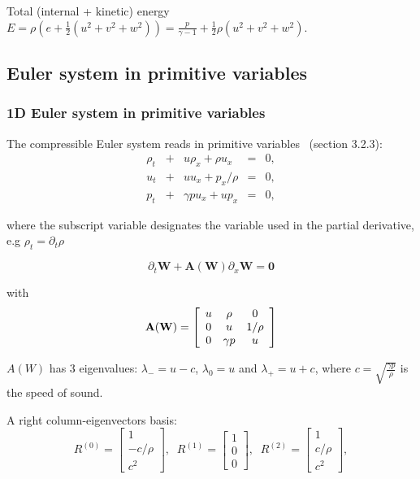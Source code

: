 \documentclass{article}
\begin{document}
Total (internal + kinetic) energy $E = \rho \left( e + \frac{1}{2} (u^2+v^2+w^2) \right) = \frac{p}{\gamma-1} + \frac{1}{2} \rho (u^2+v^2+w^2)$.

\subsection{Euler system in primitive variables}

\subsubsection*{1D Euler system in primitive variables}
The compressible Euler system reads in primitive variables~\cite{toro} (section 3.2.3):\\

\begin{equation}
  \begin{array}{ccccc}
    \rho_t & + & u\rho_x + \rho u_x   & = & 0,\\
    u_t    & + & u u_x   + p_x/\rho   & = & 0,\\
    p_t    & + & \gamma p u_x + u p_x & = & 0,
  \end{array}
\end{equation}

where the subscript variable designates the variable used in the partial derivative, e.g $\rho_t = \partial_t \rho$

\begin{equation}
  \partial_t \mathbf{W} + \mathbf{A(W)} \partial_x \mathbf{W} = \mathbf{0}
\end{equation}

with
\begin{equation}
  \mathbf{A(W)} = \left[
    \begin{array}{c c c c}
      u & \rho     & 0 \\
      0 & u        & 1/\rho\\
      0 & \gamma p & u \\
    \end{array}
  \right]
\end{equation}

$A(W)$ has 3 eigenvalues: $\lambda_{-}=u-c$, $\lambda_{0}=u$ and $\lambda_{+}=u+c$, where $c=\sqrt{\frac{\gamma p}{\rho}}$ is the speed of sound. 

A right column-eigenvectors basis:
\begin{equation}
  R^{(0)}=\left[
    \begin{array}{c}
      1\\
      -c/\rho\\
      c^2
    \end{array} \right],
  \;\;
  R^{(1)}=\left[
    \begin{array}{c}
      1\\
      0\\
      0
    \end{array} \right],
  \;\;
  R^{(2)}=\left[
    \begin{array}{c}
      1\\
      c/\rho\\
      c^2
    \end{array} \right],
\end{equation}
\end{document}
